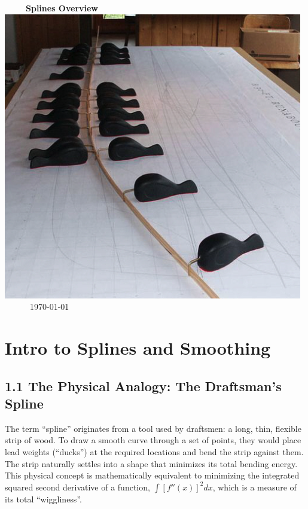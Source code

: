 \documentclass[11pt, a4paper]{article}
\begin{document}
\begin{titlepage}
 \centering %
 
 \vspace*{1cm} %
 
 {\Huge \bfseries Splines Overview}
 
 \vspace{2cm} %
 
 \includegraphics[width=0.6\linewidth]{spline-ducks.png}
 
 \vfill %
  
 \vspace{1cm}
 
 {\large \today}

\end{titlepage}

\tableofcontents
\newpage
\section{Intro to Splines and Smoothing}
\subsection{1.1 The Physical Analogy: The Draftsman's Spline}
The term ``spline'' originates from a tool used by draftsmen: a long, thin, flexible strip of wood. To draw a smooth curve through a set of points, they would place lead weights (``ducks'') at the required locations and bend the strip against them. The strip naturally settles into a shape that minimizes its total bending energy. This physical concept is mathematically equivalent to minimizing the integrated squared second derivative of a function, $\int [f''(x)]^2 dx$, which is a measure of its total ``wiggliness''.
\end{document}
